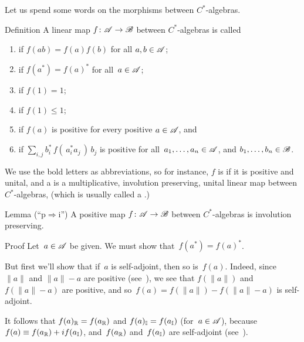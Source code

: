 \documentclass[a]{subfiles}
\begin{document}
\begin{parsec}%
\begin{point}%
Let us spend some words
on the morphisms between $C^*$-algebras.
\end{point}
\begin{point}[maps]{Definition}
A linear map $f\colon \mathscr{A} \to \mathscr{B}$
between $C^*$-algebras
is called
\begin{enumerate}
\item
{}
if $f(ab)=f(a)f(b)$ for all $a,b\in\mathscr{A}$;
\item
{}
if $f(a^*)=f(a)^*$ for all~$a\in\mathscr{A}$;
\item
{}
if $f(1)=1$;
\item
{}
if $f(1)\leq 1$;
\item
{}
if $f(a)$ is positive
for every positive $a\in\mathscr{A}$, and
\item
{}
if $\sum_{i,j} b_i^*\,f(\,a_i^*a_j\,)\,b_j$ is positive
for all~$a_1,\dotsc,a_n\in \mathscr{A}$, and $b_1,\dotsc,b_n\in\mathscr{B}$.
\end{enumerate}
\begin{point}%
We use the bold letters as abbreviations,
so for instance,
$f$ is  if it is positive and unital,
and a 
is a multiplicative, involution preserving,
unital linear map between $C^*$-algebras,
(which is usually called a .)
\end{point}
\end{point}
\begin{point}{Lemma (``p$\Rightarrow$i'')}
A positive map $f\colon \mathscr{A}\to\mathscr{B}$ between
$C^*$-algebras is involution preserving.
\begin{point}{Proof}%
Let~$a\in \mathscr{A}$ be given. We must show that~$f(a^*)=f(a)^*$.

But first we'll show that if~$a$ is self-adjoint,
then so is~$f(a)$.
Indeed, since $\|a\|$ and $\|a\|-a$ are positive (see~),
we see that $f(\|a\|)$ and $f(\|a\|-a)$ are positive,
and so~$f(a)=f(\|a\|)-f(\|a\|-a)$ is self-adjoint.

It follows that $f(a)_{\mathbb{R}}=f(a_{\mathbb{R}})$
and $f(a)_{\mathbb{I}}=f(a_{\mathbb{I}})$ (for~$a\in\mathscr{A}$),
because $f(a)\equiv f(a_{\mathbb{R}})+if(a_{\mathbb{I}})$,
and~$f(a_{\mathbb{R}})$ and~$f(a_{\mathbb{I}})$
are self-adjoint
(see~).


\end{point}
\end{point}
\end{parsec}
\end{document}
